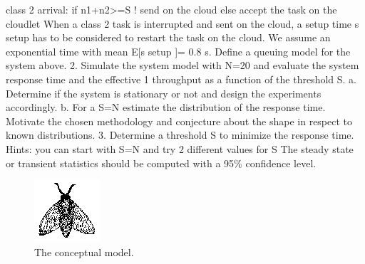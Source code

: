 class 2 arrival:
if n1+n2>=S ! send on the cloud
else accept the task on the cloudlet
%
When a class 2 task is interrupted and sent on the cloud, a setup time s setup has to be considered to restart the task on
the cloud. We assume an exponential time with mean E[s setup ]= 0.8 s.
Define a queuing model for the system above.
2. Simulate the system model with N=20 and evaluate the system response time and the effective 1 throughput
as a function of the threshold S.
a. Determine if the system is stationary or not and design the experiments accordingly.
b. For a S=N estimate the distribution of the response time. Motivate the chosen methodology and
conjecture about the shape in respect to known distributions.
3. Determine a threshold S to minimize the response time. Hints: you can start with S=N and try 2 different
values for S
The steady state or transient statistics should be computed with a 95\% confidence level.


\lipsum[1]


\lipsum[1]

\begin{figure}
  \label{fig:conceptual-model}
  \includegraphics{fig/fly}
  \caption{The conceptual model.}
\end{figure}

\lipsum[1]

\lipsum[1]

\lipsum[1]
